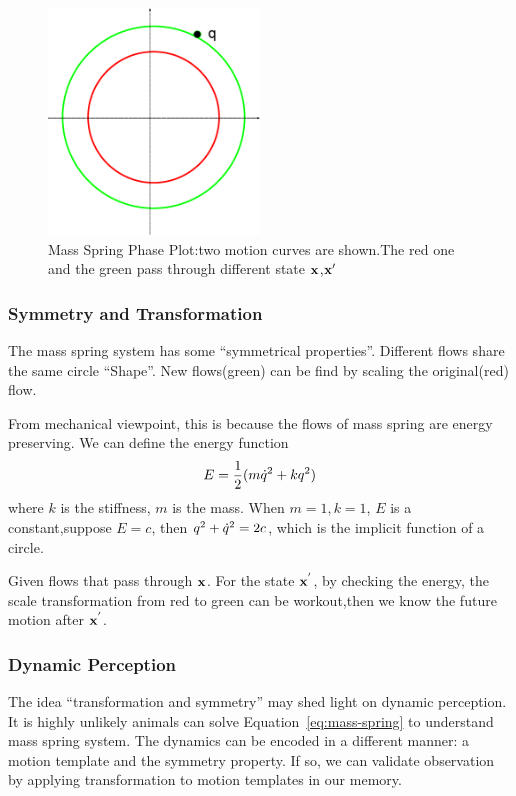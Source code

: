 \begin{figure}[!htbp]
  \begin{center}
     \includegraphics[width=0.5\textwidth]{MassSpringPhasePlot}
    \caption{Mass Spring Phase Plot:two motion curves are shown.The red one and the green pass through different state $\mathbf{x}$,$\mathbf{x}'$}
    \label{fig:massSpringPhasePlot}  
  \end{center}
\end{figure}

\subsubsection*{Symmetry and Transformation}

The mass spring system has some ``symmetrical properties''.
Different flows share the same circle ``Shape''.
New flows(green) can be find by scaling the original(red) flow.

From mechanical viewpoint, this is because the flows of mass spring are energy preserving.
We can define the energy function
\[
E=\frac{1}{2}(m\dot{q}^2+kq^2)
\]
where $k$ is the stiffness, $m$ is the mass.
When $m=1,k=1$, $E$ is a constant,suppose $E=c$,
then $q^2+\dot{q}^2=2c$, which is the implicit function of a circle.

Given flows that pass through  $\mathbf{x}$.
For the state $\mathbf{x}^{'}$, by checking the energy, the scale transformation from red to green can be workout,then we know the future motion after $\mathbf{x}^{'}$.


\subsubsection*{Dynamic Perception}

The idea ``transformation and symmetry'' may shed light on dynamic perception. 
It is highly unlikely animals can solve Equation~\ref{eq:mass-spring} to understand mass spring system.
The dynamics can be encoded in a different manner: a motion template and the symmetry property.
If so, we can validate observation by applying transformation to motion templates in our memory.


